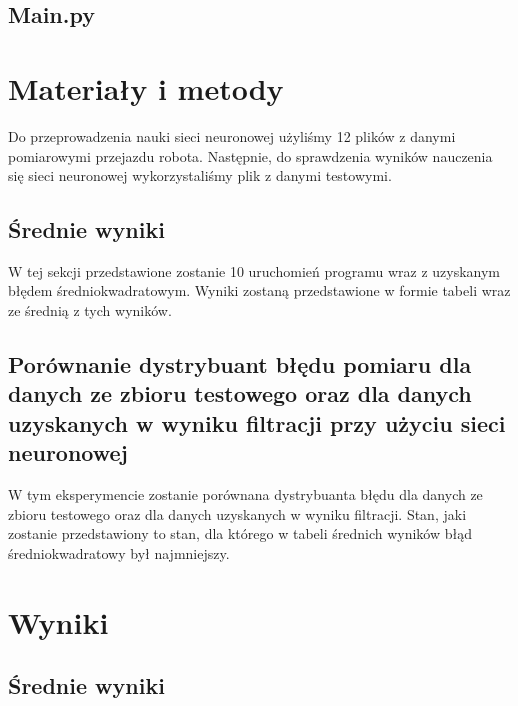 \documentclass{classrep}
\begin{document}


\subsection{Main.py}




\section{Materiały i metody}
Do przeprowadzenia nauki sieci neuronowej użyliśmy 12 plików z danymi pomiarowymi przejazdu robota. Następnie, do sprawdzenia wyników nauczenia się sieci neuronowej wykorzystaliśmy plik z danymi testowymi. \cite{pliki}

\subsection{Średnie wyniki}
W tej sekcji przedstawione zostanie 10 uruchomień programu wraz z uzyskanym błędem średniokwadratowym. Wyniki zostaną przedstawione w formie tabeli wraz ze średnią z tych wyników.

\subsection{Porównanie dystrybuant błędu pomiaru dla danych ze zbioru testowego oraz dla danych uzyskanych w wyniku filtracji przy użyciu sieci neuronowej}
W tym eksperymencie zostanie porównana dystrybuanta błędu dla danych ze zbioru testowego oraz dla danych uzyskanych w wyniku filtracji. Stan, jaki zostanie przedstawiony to stan, dla którego w tabeli średnich wyników błąd średniokwadratowy był najmniejszy.


\section{Wyniki}

\subsection{Średnie wyniki}
\end{document}
